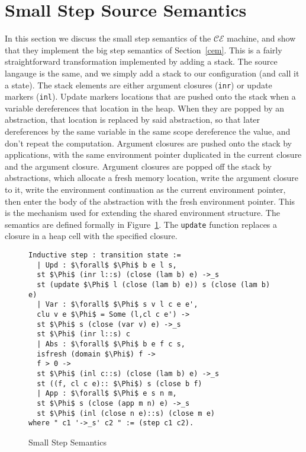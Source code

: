 \section{Small Step Source Semantics} \label{sec:cem_small}

In this section we discuss the small step semantics of the $\mathcal{CE}$
machine, and show that they implement the big step semantics of
Section~\ref{cem}. This is a fairly straightforward transformation implemented
by adding a stack. The source langauge is the same, and we simply add a stack to
our configuration (and call it a state). The stack elements are either argument
closures (\texttt{inr}) or update markers (\texttt{inl}). Update markers
locations that are pushed onto the stack when a variable dereferences that
location in the heap. When they are popped by an abstraction, that location is
replaced by said abstraction, so that later dereferences by the same variable in
the same scope dereference the value, and don't repeat the computation. Argument
closures are pushed onto the stack by applications, with the same environment
pointer duplicated in the current closure and the argument closure. Argument
closures are popped off the stack by abstractions, which allocate a fresh memory
location, write the argument closure to it, write the environment continuation
as the current environment pointer, then enter the body of the abstraction with
the fresh environment pointer. This is the mechanism used for extending the
shared environment structure. The semantics are defined formally in
Figure~\ref{fig:cesm}. The \texttt{update} function replaces a closure in a heap
cell with the specified closure.  

\begin{figure}
\begin{lstlisting}
Inductive step : transition state :=
  | Upd : $\forall$ $\Phi$ b e l s, 
  st $\Phi$ (inr l::s) (close (lam b) e) ->_s 
  st (update $\Phi$ l (close (lam b) e)) s (close (lam b) e)
  | Var : $\forall$ $\Phi$ s v l c e e', 
  clu v e $\Phi$ = Some (l,cl c e') -> 
  st $\Phi$ s (close (var v) e) ->_s 
  st $\Phi$ (inr l::s) c
  | Abs : $\forall$ $\Phi$ b e f c s, 
  isfresh (domain $\Phi$) f -> 
  f > 0 -> 
  st $\Phi$ (inl c::s) (close (lam b) e) ->_s 
  st ((f, cl c e):: $\Phi$) s (close b f)
  | App : $\forall$ $\Phi$ e s n m, 
  st $\Phi$ s (close (app m n) e) ->_s 
  st $\Phi$ (inl (close n e)::s) (close m e)
where " c1 '->_s' c2 " := (step c1 c2).
\end{lstlisting}
\caption{Small Step Semantics}
\label{fig:cesm}
\end{figure}

